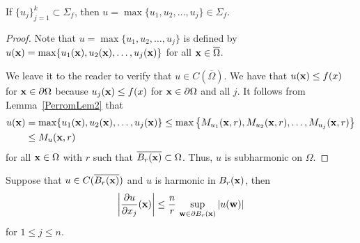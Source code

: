 \begin{lemma} \label{PerronLem5}
If $\displaystyle \{u_j\}_{j=1}^k \subset \Sigma_f$, then
$u = \max \{u_1, u_2, \ldots, u_j\} \in \Sigma_f$.
\end{lemma}

\begin{proof}
Note that $u = \max \{u_1, u_2, \ldots, u_j\}$ is defined by
$u(\mathbf{x}) = \max \{u_1(\mathbf{x}), u_2(\mathbf{x}), \ldots, u_j(\mathbf{x})\}$
for all $\mathbf{x} \in \overline{\Omega}$.

We leave it to the reader to verify that
$u \in C(\overline{\Omega})$.  We have that
$u(\mathbf{x}) \leq f(x)$ for $\mathbf{x} \in \partial \Omega$ because
$u_j(\mathbf{x}) \leq f(x)$ for $\mathbf{x} \in \partial \Omega$ and all $j$.
It follows from Lemma~\ref{PerromLem2} that
\begin{align*}
u(\mathbf{x}) &= \max \{u_1(\mathbf{x}), u_2(\mathbf{x}), \ldots, u_j(\mathbf{x})\}
\leq \max \left\{ M_{u_1}(\mathbf{x},r), M_{u_2}(\mathbf{x},r), \ldots,
M_{u_j}(\mathbf{x},r) \right\} \\
&\leq  M_u(\mathbf{x},r)
\end{align*}
for all $\mathbf{x} \in \Omega$ with $r$ such that
$\overline{B_r(\mathbf{x})} \subset \Omega$.  Thus, $u$ is subharmonic on
$\Omega$.
\end{proof}

\begin{lemma} \label{PerronLem6}
Suppose that $\displaystyle u \in C(\overline{B_r(\mathbf{x})})$
and $u$ is harmonic in $B_r(\mathbf{x})$, then
\[
\left|\frac{\partial{u}}{\partial x_j}(\mathbf{x})\right|
\leq \frac{n}{r}\, \sup_{\mathbf{w} \in \partial B_r(\mathbf{x})} |u(\mathbf{w})|
\]
for $1 \leq j \leq n$.
\end{lemma}

